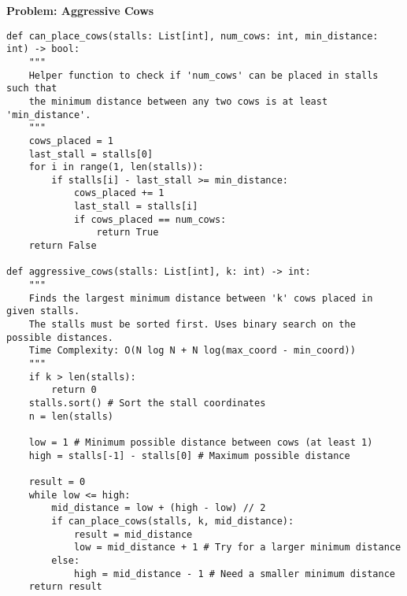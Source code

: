 \noindent\textbf{Problem: Aggressive Cows}
\begin{verbatim}
def can_place_cows(stalls: List[int], num_cows: int, min_distance: int) -> bool:
    """
    Helper function to check if 'num_cows' can be placed in stalls such that
    the minimum distance between any two cows is at least 'min_distance'.
    """
    cows_placed = 1
    last_stall = stalls[0]
    for i in range(1, len(stalls)):
        if stalls[i] - last_stall >= min_distance:
            cows_placed += 1
            last_stall = stalls[i]
            if cows_placed == num_cows:
                return True
    return False

def aggressive_cows(stalls: List[int], k: int) -> int:
    """
    Finds the largest minimum distance between 'k' cows placed in given stalls.
    The stalls must be sorted first. Uses binary search on the possible distances.
    Time Complexity: O(N log N + N log(max_coord - min_coord))
    """
    if k > len(stalls):
        return 0 
    stalls.sort() # Sort the stall coordinates
    n = len(stalls)

    low = 1 # Minimum possible distance between cows (at least 1)
    high = stalls[-1] - stalls[0] # Maximum possible distance

    result = 0
    while low <= high:
        mid_distance = low + (high - low) // 2
        if can_place_cows(stalls, k, mid_distance):
            result = mid_distance
            low = mid_distance + 1 # Try for a larger minimum distance
        else:
            high = mid_distance - 1 # Need a smaller minimum distance
    return result
\end{verbatim}

